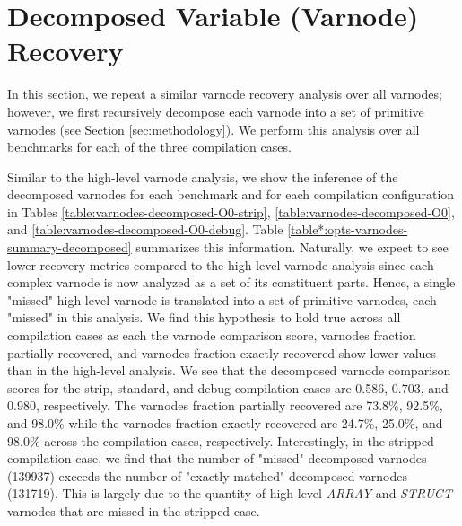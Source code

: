 \section{Decomposed Variable (Varnode) Recovery}

In this section, we repeat a similar varnode recovery analysis over all varnodes; however, we first recursively decompose each varnode into a set of primitive varnodes (see Section \ref{sec:methodology}). We perform this analysis over all benchmarks for each of the three compilation cases.



Similar to the high-level varnode analysis, we show the inference of the decomposed varnodes for each benchmark and for each compilation configuration in Tables \ref{table:varnodes-decomposed-O0-strip}, \ref{table:varnodes-decomposed-O0}, and \ref{table:varnodes-decomposed-O0-debug}. Table \ref{table*:opts-varnodes-summary-decomposed} summarizes this information. Naturally, we expect to see lower recovery metrics compared to the high-level varnode analysis since each complex varnode is now analyzed as a set of its constituent parts. Hence, a single "missed" high-level varnode is translated into a set of primitive varnodes, each "missed" in this analysis. We find this hypothesis to hold true across all compilation cases as each the varnode comparison score, varnodes fraction partially recovered, and varnodes fraction exactly recovered show lower values than in the high-level analysis. We see that the decomposed varnode comparison scores for the strip, standard, and debug compilation cases are 0.586, 0.703, and 0.980, respectively. The varnodes fraction partially recovered are 73.8\%, 92.5\%, and 98.0\% while the varnodes fraction exactly recovered are 24.7\%, 25.0\%, and 98.0\% across the compilation cases, respectively. Interestingly, in the stripped compilation case, we find that the number of "missed" decomposed varnodes (139937) exceeds the number of "exactly matched" decomposed varnodes (131719). This is largely due to the quantity of high-level \emph{ARRAY} and \emph{STRUCT} varnodes that are missed in the stripped case.



